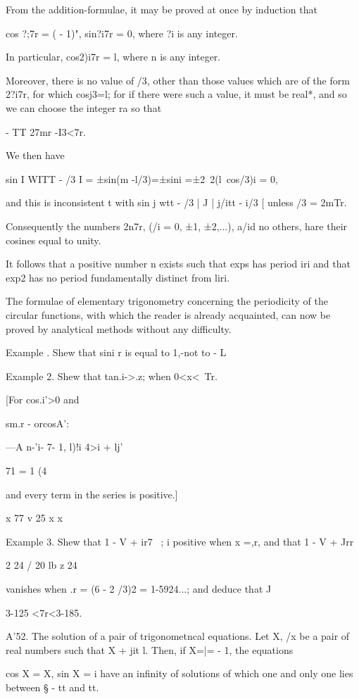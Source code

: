 %
%

From the addition-formulae, it may be proved at once by induction that

cos ?;7r = ( - 1)", sin?i7r = 0, where ?i is any integer.

In particular, cos2)i7r = l, where n is any integer.

Moreover, there is no value of /3, other than those values which are
of the form 2?i7r, for which cosj3=l; for if there were such a value,
it must be real*, and so we can choose the integer ra so that

- TT 27mr -I3<7r.

We then have

sin I WITT - /3 I = ±sin(m -l/3)=±sini =±2~2(l\ cos/3)i = 0,

and this is inconsistent t with sin j wtt - /3 | J | j/itt - i/3 [
unless /3 = 2mTr.

Consequently the numbers 2n7r, (/i = 0, ±1, ±2,...), a/id no others,
hare their cosines equal to unity.

It follows that a positive number n exists such that exps has period
iri and that exp2 has no period fundamentally distinct from liri.

The formulae of elementary trigonometry concerning the periodicity of
the circular functions, with which the reader is already acquainted,
can now be proved by analytical methods without any difficulty.

Example . Shew that sini r is equal to 1,-not to - L

Example 2. Shew that tan.i->.z; when 0<x<\ Tr.

[For cos.i'>0 and

sm.r - orcosA':

---A n-'i- 7- 1, l)!i 4>i + lj'

71 = 1 (4

and every term in the series is positive.]

x 77 v 25 x x

Example 3. Shew that 1 - V + ir7 ~; i positive when x =,r, and that
1 - V + Jrr

2 24 / 20 lb z 24

vanishes when .r = (6 - 2 /3)2 = 1-5924...; and deduce that J

3-125 <7r<3-185.

A'52. The solution of a pair of trigonometncal equations. Let X, /x be
a pair of real numbers such that X + jit l. Then, if X=|= - 1, the
equations

cos X = X, sin X = i have an infinity of solutions of which one and
only one lies between § - tt and tt.

